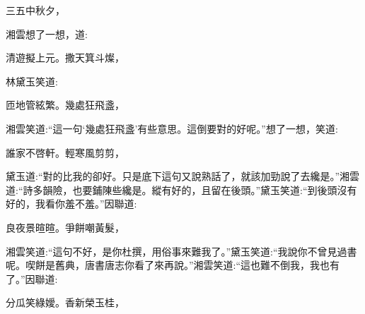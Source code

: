 \begin{poem}
    \begin{pl}三五中秋夕，\end{pl}
\end{poem}


\begin{parag}
    湘雲想了一想，道:
\end{parag}


\begin{poem}
    \begin{pl} 清遊擬上元。撒天箕斗燦，\end{pl}
\end{poem}


\begin{parag}
    林黛玉笑道:
\end{parag}


\begin{poem}
    \begin{pl}匝地管絃繁。幾處狂飛盞，\end{pl}
\end{poem}


\begin{parag}
    湘雲笑道:“這一句‘幾處狂飛盞’有些意思。這倒要對的好呢。”想了一想，笑道:
\end{parag}


\begin{poem}
    \begin{pl}誰家不啓軒。輕寒風剪剪，\end{pl}
\end{poem}


\begin{parag}
    黛玉道:“對的比我的卻好。只是底下這句又說熟話了，就該加勁說了去纔是。”湘雲道:“詩多韻險，也要鋪陳些纔是。縱有好的，且留在後頭。”黛玉笑道:“到後頭沒有好的，我看你羞不羞。”因聯道:
\end{parag}


\begin{poem}
    \begin{pl}良夜景暄暄。爭餅嘲黃髮，\end{pl}
\end{poem}


\begin{parag}
    湘雲笑道:“這句不好，是你杜撰，用俗事來難我了。”黛玉笑道:“我說你不曾見過書呢。喫餅是舊典，唐書唐志你看了來再說。”湘雲笑道:“這也難不倒我，我也有了。”因聯道:
\end{parag}


\begin{poem}
    \begin{pl}分瓜笑綠嬡。香新榮玉桂，\end{pl}
\end{poem}



